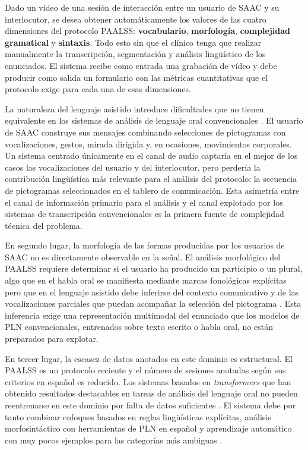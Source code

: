 Dado un vídeo de una sesión de interacción entre un usuario de \ac{SAAC} y su
interlocutor, se desea obtener automáticamente los valores de las cuatro dimensiones del
protocolo \ac{PAALSS}: \textbf{vocabulario}, \textbf{morfología}, 
\textbf{complejidad gramatical} y \textbf{sintaxis}. Todo esto sin que el clínico 
tenga que realizar manualmente la transcripción, segmentación y análisis lingüístico de
los enunciados. El sistema recibe como entrada una grabación de vídeo y debe producir 
como salida un formulario con las métricas cuantitativas que el protocolo 
exige para cada una de esas dimensiones.

La naturaleza del lenguaje asistido introduce dificultades que no tienen
equivalente en los sistemas de análisis de lenguaje oral convencionales 
\cite{lsa_computer_programs}. El usuario de \ac{SAAC} construye sus mensajes combinando 
selecciones de pictogramas con vocalizaciones, gestos, mirada dirigida y, en ocasiones, 
movimientos corporales. Un sistema centrado únicamente en el canal de audio captaría en 
el mejor de los casos las vocalizaciones del usuario y del interlocutor, pero perdería 
la contribución lingüística más relevante para el análisis del protocolo: la secuencia de
pictogramas seleccionados en el tablero de comunicación. Esta asimetría entre
el canal de información primario para el análisis y el canal explotado por los
sistemas de transcripción convencionales es la primera fuente de complejidad
técnica del problema.

En segundo lugar, la morfología de las formas producidas por los usuarios de
\ac{SAAC} no es directamente observable en la señal. El análisis morfológico del
\ac{PAALSS} requiere determinar si el usuario ha producido un participio o un
plural, algo que en el habla oral se manifiesta mediante marcas fonológicas
explícitas pero que en el lenguaje asistido debe inferirse del contexto
comunicativo y de las vocalizaciones parciales que puedan acompañar la selección 
del pictograma \cite{soto2022paalss_tutorial}. Esta inferencia exige una representación
multimodal del enunciado que los modelos de \ac{PLN} convencionales, entrenados
sobre texto escrito o habla oral, no están preparados para explotar.

En tercer lugar, la escasez de datos anotados en este dominio es estructural.
El \ac{PAALSS} es un protocolo reciente y el número de sesiones anotadas según sus 
criterios en español es reducido. Los sistemas basados en \emph{transformers} que han 
obtenido resultados destacables en tareas de análisis del lenguaje oral no pueden 
reentrenarse en este dominio por falta de datos suficientes \cite{lsa_automation_jslhr}. 
El sistema debe por tanto combinar enfoques basados en reglas lingüísticas explícitas, 
análisis morfosintáctico con herramientas de \ac{PLN} en español y aprendizaje
automático con muy pocos ejemplos para las categorías más ambiguas
\cite{fewshot_clinical_nlp}.

